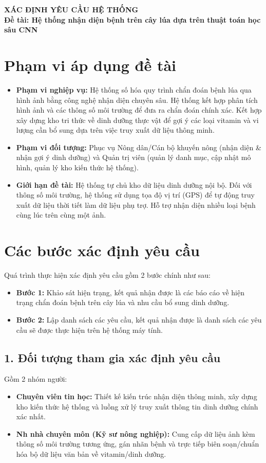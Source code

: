 \documentclass[12pt,a4paper]{article}
\begin{document}
\begin{center}
    \Large\textbf{XÁC ĐỊNH YÊU CẦU HỆ THỐNG} \\
    \vspace{0.2cm}
    \large\textbf{Đề tài: Hệ thống nhận diện bệnh trên cây lúa dựa trên thuật toán học sâu CNN}
\end{center}

\section*{Phạm vi áp dụng đề tài}
\begin{itemize}
    \item \textbf{Phạm vi nghiệp vụ:} Hệ thống số hóa quy trình chẩn đoán bệnh lúa qua hình ảnh bằng công nghệ nhận diện chuyên sâu. Hệ thống kết hợp phân tích hình ảnh và các thông số môi trường để đưa ra chẩn đoán chính xác. Kết hợp xây dựng kho tri thức về dinh dưỡng thực vật để gợi ý các loại vitamin và vi lượng cần bổ sung dựa trên việc truy xuất dữ liệu thông minh.
    \item \textbf{Phạm vi đối tượng:} Phục vụ Nông dân/Cán bộ khuyến nông (nhận diện \& nhận gợi ý dinh dưỡng) và Quản trị viên (quản lý danh mục, cập nhật mô hình, quản lý kho kiến thức hệ thống).
    \item \textbf{Giới hạn đề tài:} Hệ thống tự chủ kho dữ liệu dinh dưỡng nội bộ. Đối với thông số môi trường, hệ thống sử dụng tọa độ vị trí (GPS) để tự động truy xuất dữ liệu thời tiết làm dữ liệu phụ trợ. Hỗ trợ nhận diện nhiều loại bệnh cùng lúc trên cùng một ảnh.
\end{itemize}

\section*{Các bước xác định yêu cầu}

Quá trình thực hiện xác định yêu cầu gồm 2 bước chính như sau:
\begin{itemize}
    \item \textbf{Bước 1:} Khảo sát hiện trạng, kết quả nhận được là các báo cáo về hiện trạng chẩn đoán bệnh trên cây lúa và nhu cầu bổ sung dinh dưỡng.
    \item \textbf{Bước 2:} Lập danh sách các yêu cầu, kết quả nhận được là danh sách các yêu cầu sẽ được thực hiện trên hệ thống máy tính.
\end{itemize}

\subsection*{1. Đối tượng tham gia xác định yêu cầu}
Gồm 2 nhóm người:
\begin{itemize}
    \item \textbf{Chuyên viên tin học:} Thiết kế kiến trúc nhận diện thông minh, xây dựng kho kiến thức hệ thống và luồng xử lý truy xuất thông tin dinh dưỡng chính xác nhất.
    \item \textbf{Nh nhà chuyên môn (Kỹ sư nông nghiệp):} Cung cấp dữ liệu ảnh kèm thông số môi trường tương ứng, gán nhãn bệnh và trực tiếp biên soạn/chuẩn hóa bộ dữ liệu văn bản về vitamin/dinh dưỡng.
\end{itemize}
\end{document}
